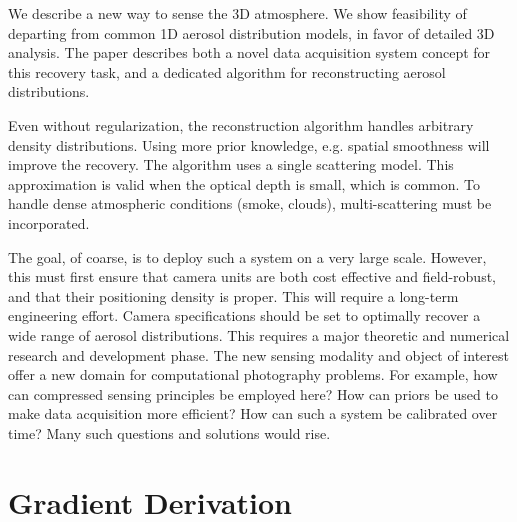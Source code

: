 \documentclass[10pt,letterpaper]{article}
\begin{document}
We describe a new way to sense the 3D atmosphere. We show feasibility
of departing from common 1D aerosol distribution models, in favor of
detailed 3D analysis.  The paper describes both a novel data
acquisition system concept for this recovery task, and a dedicated
algorithm for reconstructing aerosol distributions.

Even without regularization, the reconstruction algorithm handles
arbitrary density distributions. Using more prior knowledge,
e.g. spatial smoothness will improve the recovery.  The algorithm uses
a single scattering model. This approximation is valid when the
optical depth is small, which is common. To handle dense atmospheric
conditions (smoke, clouds), multi-scattering must be incorporated.

The goal, of coarse, is to deploy such a system on a very large
scale. However, this must first ensure that camera units are both cost
effective and field-robust, and that their positioning density is
proper. This will require a long-term engineering effort. Camera
specifications should be set to optimally recover a wide range of
aerosol distributions. This requires a major theoretic and numerical
research and development phase.  The new sensing modality and object
of interest offer a new domain for computational photography
problems. For example, how can compressed sensing principles be
employed here? How can priors be used to make data acquisition more
efficient? How can such a system be calibrated over time? Many such
questions and solutions would rise.


\appendix


\section{Gradient Derivation}
\label{sec:gradient-derivation}
\end{document}

